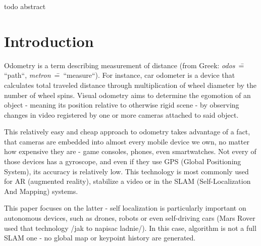 todo abstract

\chapter*{Introduction}

Odometry is a term describing measurement of distance (from Greek: \textit{odos}~\==~ ``path``, \textit{metron}~\==~``measure``). For instance, car odometer is a device that calculates total traveled distance through multiplication of wheel diameter by the number of wheel spins. %
Visual odometry aims to determine the egomotion of an object - meaning its position relative to otherwise rigid scene - by observing changes in video registered by one or more cameras attached to said object.


This relatively easy and cheap approach to odometry takes advantage of a fact, that cameras are embedded into almost every mobile device we own, no matter how expensive they are - game consoles, phones, even smartwatches. Not every of those devices has a gyroscope, and even if they use GPS (Global Positioning System), its accuracy is relatively low. This technology is most commonly used for AR (augmented reality), stabilize a video or in the SLAM (Self-Localization And Mapping) systems.

This paper focuses on the latter - self localization is particularly important on autonomous devices, such as drones, robots or even self-driving cars (Mars Rover used that technology /jak to napisac ladnie/). In this case, algorithm is not a full SLAM one - no global map or keypoint history are generated.

